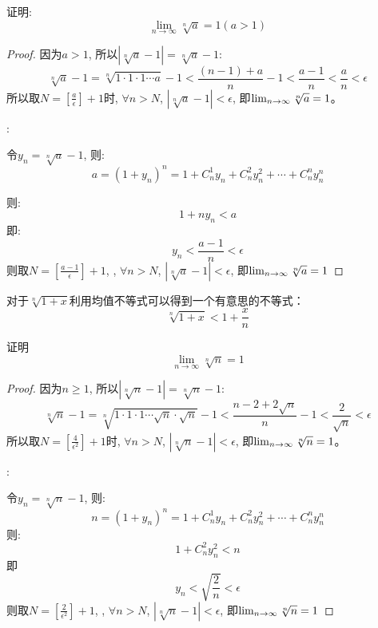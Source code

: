 \begin{example}\label{example-chapter2-1}
    证明:
    \[ \lim_{n \to \infty } \sqrt[n]{a}= 1 (a > 1)\]
\end{example}
\begin{proof}
    因为$a > 1$, 所以$\left| \sqrt[n]{a} - 1 \right| =\sqrt[n]{a} - 1$:
    \begin{equation*}
        \sqrt[n]{a} - 1 = \sqrt[n]{1\cdot 1\cdot 1\cdots a} - 1 < \frac{(n - 1) + a}{n} - 1 < \frac{a - 1}{n} < \frac{a}{n} < \epsilon 
    \end{equation*}
    所以取$N = \left[ \frac{a}{\epsilon} \right] + 1$时, $\forall n > N$, $\left| \sqrt[n]{a} - 1\right| < \epsilon$, 即$\lim_{n \to \infty } \sqrt[n]{a} = 1$。

    :

    令$y_n = \sqrt[n]{a} - 1$, 则:
    \begin{equation*}
        a = (1 + y_n)^n = 1 + C_n^1 y_n + C_n^2 y_n^2 + \cdots + C_n^n y_n^n         
    \end{equation*}

    则:
    \[ 1 + ny_n < a \]
    即:
    \[ y_n < \frac{a - 1}{n} < \epsilon \]
    则取$N = \left[ \frac{a - 1}{\epsilon} \right] + 1$, , $\forall n > N$, $\left| \sqrt[n]{a} - 1\right| < \epsilon$, 即$\lim_{n \to \infty } \sqrt[n]{a} = 1$
\end{proof}
\begin{remark}
    对于$\sqrt[n]{1+x}$利用均值不等式可以得到一个有意思的不等式：
    \begin{equation*}
        \sqrt[n]{1+x} < 1 + \frac{x}{n}
    \end{equation*}
\end{remark}
\begin{example}
    证明
    \[ \lim_{n \to \infty } \sqrt[n]{n}= 1 \]
\end{example}
\begin{proof}
    因为$n \ge 1$, 所以$\left| \sqrt[n]{n} - 1 \right| = \sqrt[n]{n} - 1$:
    \[ \sqrt[n]{n} -1 = \sqrt[n]{1\cdot 1\cdot 1\cdots \sqrt{n} \cdot \sqrt{n} } -1 < \frac{n-2+2\sqrt{n}}{n} - 1 < \frac{2}{\sqrt{n}} < \epsilon \]
    所以取$N = \left[ \frac{4}{\epsilon^2}\right] + 1$时, $\forall n > N$, $\left| \sqrt[n]{n} - 1\right| < \epsilon$, 即$\lim_{n \to \infty } \sqrt[n]{n} = 1$。

    :

    令$y_n = \sqrt[n]{n} - 1$, 则:
    \begin{equation*}
        n = (1 + y_n)^n = 1 + C_n^1 y_n + C_n^2 y_n^2 + \cdots + C_n^n y_n^n
    \end{equation*}
    则:
    \[ 1 + C_n^2 y_n^2 < n \]
    即
    \[ y_n < \sqrt{\frac{2}{n}} < \epsilon \]
    则取$N = \left[ \frac{2}{\epsilon^2} \right] + 1$, , $\forall n > N$, $\left| \sqrt[n]{n} - 1\right| < \epsilon$, 即$\lim_{n \to \infty } \sqrt[n]{n} = 1$
\end{proof}

